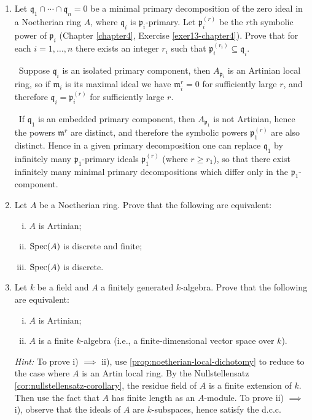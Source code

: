 
\begin{enumerate}
    \item \label{exer1-chapter8}Let $\mathfrak{q}_1 \cap \cdots \cap \mathfrak{q}_n = 0$ be a minimal primary decomposition of the zero ideal in a Noetherian ring $A$, where $\mathfrak{q}_i$ is $\mathfrak{p}_i$-primary. Let $\mathfrak{p}_i^{(r)}$ be the $r$th symbolic power of $\mathfrak{p}_i$ (Chapter \ref{chapter4}, Exercise \ref{exer13-chapter4}). Prove that for each $i = 1, \ldots, n$ there exists an integer $r_i$ such that $\mathfrak{p}_i^{(r_i)} \subseteq \mathfrak{q}_i$.
    
    \quad\, Suppose $\mathfrak{q}_i$ is an isolated primary component, then $A_{\mathfrak{p}_i}$ is an Artinian local ring, so if $\mathfrak{m}_i$ is its maximal ideal we have $\mathfrak{m}_i^r = 0$ for sufficiently large $r$, and therefore $\mathfrak{q}_i = \mathfrak{p}_i^{(r)}$ for sufficiently large $r$.

    \quad\, If $\mathfrak{q}_1$ is an embedded primary component, then $A_{\mathfrak{p}_1}$ is not Artinian, hence the powers $\mathfrak{m}^r$ are distinct, and therefore the symbolic powers $\mathfrak{p}_1^{(r)}$ are also distinct. Hence in a given primary decomposition one can replace $\mathfrak{q}_1$ by infinitely many $\mathfrak{p}_1$-primary ideals $\mathfrak{p}_1^{(r)}$ (where $r \geq r_1$), so that there exist infinitely many minimal primary decompositions which differ only in the $\mathfrak{p}_1$-component.

    \item \label{exer2-chapter8}Let $A$ be a Noetherian ring. Prove that the following are equivalent:
    \begin{enumerate}[i)]
        \item $A$ is Artinian;
        \item $\operatorname{Spec}(A)$ is discrete and finite;
        \item $\operatorname{Spec}(A)$ is discrete.
    \end{enumerate}

    \item \label{exer3-chapter8}Let $k$ be a field and $A$ a finitely generated $k$-algebra. Prove that the following are equivalent:
    \begin{enumerate}[i)]
        \item $A$ is Artinian;
        \item $A$ is a finite $k$-algebra (i.e., a finite-dimensional vector space over $k$).
    \end{enumerate}
    \textit{Hint:} To prove i) $\implies$ ii), use \eqref{prop:noetherian-local-dichotomy} to reduce to the case where $A$ is an Artin local ring. By the Nullstellensatz \eqref{cor:nullstellensatz-corollary}, the residue field of $A$ is a finite extension of $k$. Then use the fact that $A$ has finite length as an $A$-module. To prove ii) $\implies$ i), observe that the ideals of $A$ are $k$-subspaces, hence satisfy the d.c.c.


\end{enumerate}
